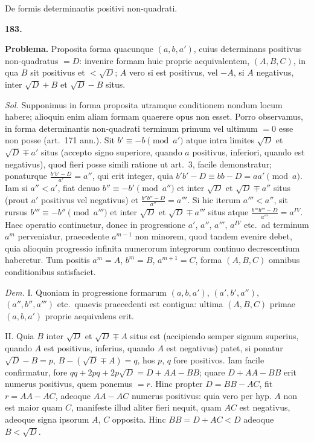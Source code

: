 \documentclass[12pt,a4paper]{article}
\theoremstyle{plain}
\begin{document}
\newpage

\begin{center}
\Large De formis determinantis positivi non-quadrati.
\end{center}

\bigskip

\textbf{183.}

\textbf{Problema.} Proposita forma quacunque $(a,b,a')$, cuius determinans positivus non-quadratus $= D$: invenire formam huic proprie aequivalentem, $(A,B,C)$, in qua $B$ sit positivus et $< \sqrt{D}$; $A$ vero si est positivus, vel $-A$, si $A$ negativus, inter $\sqrt{D}+B$ et $\sqrt{D}-B$ situs.

\textit{Sol.} Supponimus in forma proposita utramque conditionem nondum locum habere; alioquin enim aliam formam quaerere opus non esset. Porro observamus, in forma determinantis non-quadrati terminum primum vel ultimum $= 0$ esse non posse (art.~171 ann.). Sit $b' \equiv -b \pmod{a'}$ atque intra limites $\sqrt{D}$ et $\sqrt{D} \mp a'$ situs (accepto signo superiore, quando $a$ positivus, inferiori, quando est negativus), quod fieri posse simili ratione ut art.~3, facile demonstratur; ponaturque $\frac{b'b' - D}{a'} = a''$, qui erit integer, quia $b'b' - D \equiv bb - D = aa' \pmod{a}$. Iam si $a'' < a'$, fiat denuo $b'' \equiv -b' \pmod{a''}$ et inter $\sqrt{D}$ et $\sqrt{D} \mp a''$ situs (prout $a'$ positivus vel negativus) et $\frac{b''b'' - D}{a''} = a'''$. Si hic iterum $a''' < a''$, sit rursus $b''' \equiv -b'' \pmod{a'''}$ et inter $\sqrt{D}$ et $\sqrt{D} \mp a'''$ situs atque $\frac{b'''b''' - D}{a'''} = a^{IV}$. Haec operatio continuetur, donec in progressione $a'$, $a''$, $a'''$, $a^{IV}$ etc.~ad terminum $a^m$ perveniatur, praecedente $a^{m-1}$ non minorem, quod tandem evenire debet, quia alioquin progressio infinita numerorum integrorum continuo decrescentium haberetur. Tum positis $a^m = A$, $b^m = B$, $a^{m+1} = C$, forma $(A,B,C)$ omnibus conditionibus satisfaciet.

\textit{Dem.} I. Quoniam in progressione formarum $(a,b,a')$, $(a',b',a'')$, $(a'',b'',a''')$ etc.~quaevis praecedenti est contigua: ultima $(A,B,C)$ primae $(a,b,a')$ proprie aequivalens erit.

II. Quia $B$ inter $\sqrt{D}$ et $\sqrt{D} \mp A$ situs est (accipiendo semper signum superius, quando $A$ est positivus, inferius, quando $A$ est negativus) patet, si ponatur $\sqrt{D} - B = p$, $B - (\sqrt{D} \mp A) = q$, hos $p$, $q$ fore positivos. Iam facile confirmatur, fore $qq + 2pq + 2p\sqrt{D} = D + AA - BB$; quare $D + AA - BB$ erit numerus positivus, quem ponemus $= r$. Hinc propter $D = BB - AC$, fit $r = AA - AC$, adeoque $AA - AC$ numerus positivus: quia vero per hyp. $A$ non est maior quam $C$, manifeste illud aliter fieri nequit, quam $AC$ est negativus, adeoque signa ipsorum $A$, $C$ opposita. Hinc $BB = D + AC < D$ adeoque $B < \sqrt{D}$.
\end{document}
